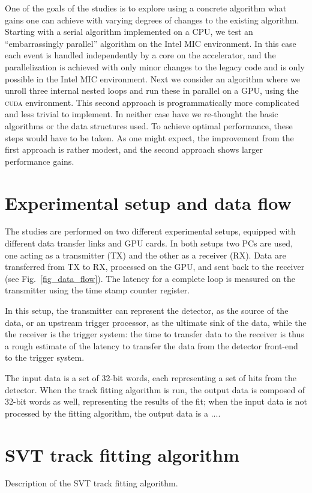 \documentclass[letterpaper]{jpconf}
\begin{document}
One of the goals of the studies is to explore using a concrete
algorithm what gains one can achieve with varying degrees of changes
to the existing algorithm. Starting with a serial algorithm
implemented on a CPU, we test an ``embarrassingly parallel'' algorithm
on the Intel MIC environment. In this case each event is handled
independently by a core on the accelerator, and the parallelization is
achieved with only minor changes to the legacy code and is only
possible in the Intel MIC environment. Next we consider an algorithm
where we unroll three internal nested loops and run these in parallel
on a GPU, using the \textsc{cuda} environment. This second approach is
programmatically more complicated and less trivial to implement. In
neither case have we re-thought the basic algorithms or the data
structures used. To achieve optimal performance, these steps would
have to be taken.  As one might expect, the improvement from the first
approach is rather modest, and the second approach shows larger
performance gains.


\section{Experimental setup and data flow}
The studies are performed on two different experimental setups,
equipped with different data transfer links and GPU cards.  In both
setups two PCs are used, one acting as a transmitter (TX) and the
other as a receiver (RX).  Data are transferred from TX to RX,
processed on the GPU, and sent back to the receiver (see
Fig.~\ref{fig_data_flow}).  The latency for a complete loop is
measured on the transmitter using the time stamp counter register.

In this setup, the transmitter can represent the detector, as
the source of the data, or an upstream trigger processor, as
the ultimate sink of the data, while the the receiver is the
trigger system: the time to transfer data to the receiver is thus a
rough estimate of the latency to transfer the data from the detector
front-end to the trigger system.
 
The input data is a set of 32-bit words, each representing a set of
hits from the detector. When the track fitting algorithm is run, the
output data is composed of 32-bit words as well, representing the
results of the fit; when the input data is not processed by the
fitting algorithm, the output data is a .... 

\section{SVT track fitting algorithm}
Description of the SVT track fitting algorithm. 
\end{document}
